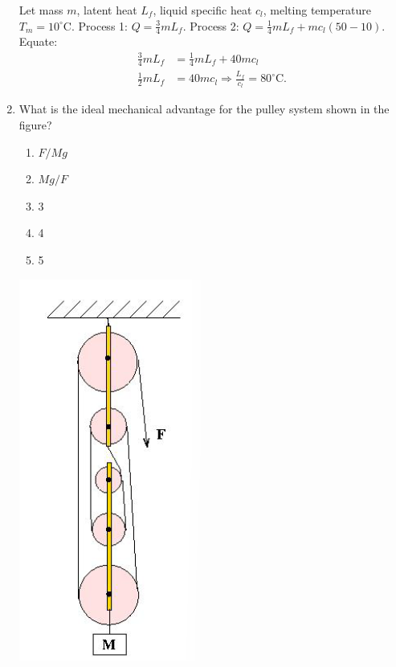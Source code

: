 ﻿\documentclass[12pt, a4paper]{article}
\begin{document}
\begin{CJK*}{UTF8}{gbsn}
\begin{enumerate}[itemsep=1.0em, topsep=0.6em]
\begin{solutionbox}
Let mass $m$, latent heat $L_f$, liquid specific heat $c_l$, melting temperature $T_m=10^{\circ}\text{C}$. Process 1: $Q=\tfrac{3}{4}mL_f$. Process 2: $Q=\tfrac{1}{4}mL_f + mc_l(50-10)$. Equate:
\begin{align*}
\tfrac{3}{4} mL_f &= \tfrac{1}{4} mL_f + 40 m c_l \\
\tfrac{1}{2} mL_f &= 40 m c_l \Rightarrow \frac{L_f}{c_l} = 80^{\circ}\text{C}.
\end{align*}
\end{solutionbox}

\newpage

\item \label{prob:5}
\noindent\begin{minipage}[t]{0.6\linewidth}
\vspace{0pt}
What is the ideal mechanical advantage for the pulley system shown in the figure?
\begin{enumerate}[label=(\Alph*)]
    \item $F/Mg$
    \item $Mg/F$
    \item 3
    \item 4
    \item 5
\end{enumerate}
\end{minipage}%
\hfill
\begin{minipage}[t]{0.33\linewidth}
\vspace{0pt}
\centering
\includegraphics[width=0.6\linewidth]{Problem_05_Figure.png}
\end{minipage}


\end{enumerate}
\end{CJK*}
\end{document}
